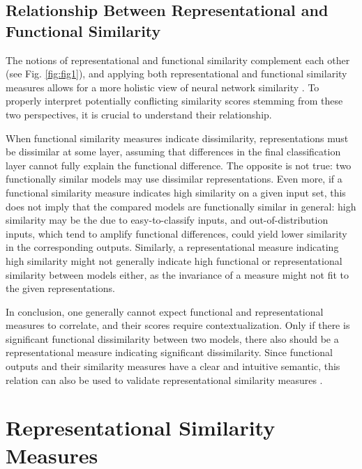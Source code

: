\documentclass{article}
\begin{document}
\subsection{Relationship Between Representational and Functional Similarity}\label{subsec:relation_func_rep}
The notions of representational and functional similarity complement each other (see Fig. \ref{fig:fig1}), and applying both representational and functional similarity measures allows for a more holistic view of neural network similarity \cite[e.g.,][]{summers_nondeterminism_2021,klabunde_prediction_2023,gwilliam_beyond_2022}.
To properly interpret potentially conflicting similarity scores stemming from these two perspectives, it is crucial to understand their relationship.

When functional similarity measures indicate dissimilarity, representations must be dissimilar at some layer, assuming that differences in the final classification layer cannot fully explain the functional difference.
The opposite is not true: two functionally similar models may use dissimilar representations.
Even more, if a functional similarity measure indicates high similarity on a given input set, this does not imply that the compared models are functionally similar in general: high similarity may be the due to easy-to-classify inputs, and out-of-distribution inputs, which tend to amplify functional differences, could yield lower similarity in the corresponding outputs.
Similarly, a representational measure indicating high similarity might not generally indicate high functional or representational similarity between models either, as the invariance of a measure might not fit to the given representations.

In conclusion, one generally cannot expect functional and representational measures to correlate, and their scores require contextualization. Only if there is significant functional dissimilarity between two models, there also should be a representational measure indicating significant dissimilarity.
Since functional outputs and their similarity measures have a clear and intuitive semantic, this relation can also be used to validate representational similarity measures \cite{ding_grounding_2021}.


\section{Representational Similarity Measures}
\label{sec:repsim_methods}
\end{document}
